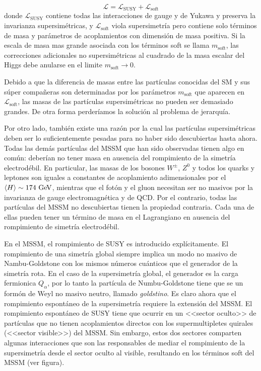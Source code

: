 \begin{equation}
  \mathcal{L} = \mathcal{L}_\text{SUSY} + \mathcal{L}_\text{soft}
\end{equation}
%
donde $\mathcal{L}_\text{SUSY}$ contiene todas las interacciones de gauge y
de Yukawa y preserva la invarianza supersimétricas, y $\mathcal{L}_\text{soft}$
viola supersimetría pero contiene solo términos de masa y parámetros de
acoplamientos con dimensión de masa positiva.
Si la escala de masa mas grande asociada  con los términos soft se llama $m_\text{soft}$,
las correcciones adicionales no supersimétricas al cuadrado de la masa escalar del Higgs
debe anularse en el limite $m_\text{soft} \to 0$.

Debido a que la diferencia de masas entre las partículas conocidas del SM y sus
súper compañeras son determinadas por los parámetros $m_\text{soft}$ que aparecen
en $\mathcal{L}_\text{soft}$, las masas de las partículas supersimétricas no
pueden ser demasiado grandes. De otra forma perderíamos la solución al problema
de jerarquía.

Por otro lado, también existe una razón por la cual las partículas supersimétricas
deben ser lo suficientemente pesadas para no haber sido descubiertas hasta ahora.
Todas las demás partículas del MSSM que han sido observadas tienen algo en común:
deberían no tener masa en ausencia del rompimiento de la simetría electrodébil.
En particular, las masas de los bosones $W^\pm$, $Z^0$ y todos los quarks y
leptones son iguales a constantes de acoplamiento adimensionales por el
$\avg{H} \sim 174 \gev$, mientras que el fotón y el gluon necesitan ser no masivos
por la invarianza de gauge electromagnética y de QCD. Por el contrario, todas
las partículas del MSSM no descubiertas tienen la propiedad contraria. Cada una
de ellas pueden tener un término de masa en el Lagrangiano en ausencia del
rompimiento de simetría electrodébil.

En el MSSM, el rompimiento de SUSY es introducido explícitamente.
El rompimiento de una simetría global siempre implica un modo
no masivo de Nambu-Goldstone con los mismos números cuánticos que
el generador de la simetría rota. En el caso de la supersimetría
global, el generador es la carga fermionica $Q_\alpha$, por lo
tanto la partícula de Numbu-Goldstone tiene que se un formón
de Weyl no masivo neutro, llamado \emph{goldstino}.
Es claro ahora que el rompimiento espontáneo de la supersimetría
requiere la extensión del MSSM.
El rompimiento espontáneo de SUSY tiene que ocurrir en un
<<sector oculto>>  de partículas que no tienen acoplamientos
directos con los supermultipletes quirales (<<sector visible>>)
del MSSM. Sin embargo, estos dos sectores comparten algunas
interacciones que son las responsables de mediar el rompimiento
de la supersimetría desde el sector oculto al visible, resultando
en los términos soft del MSSM (ver figura).

